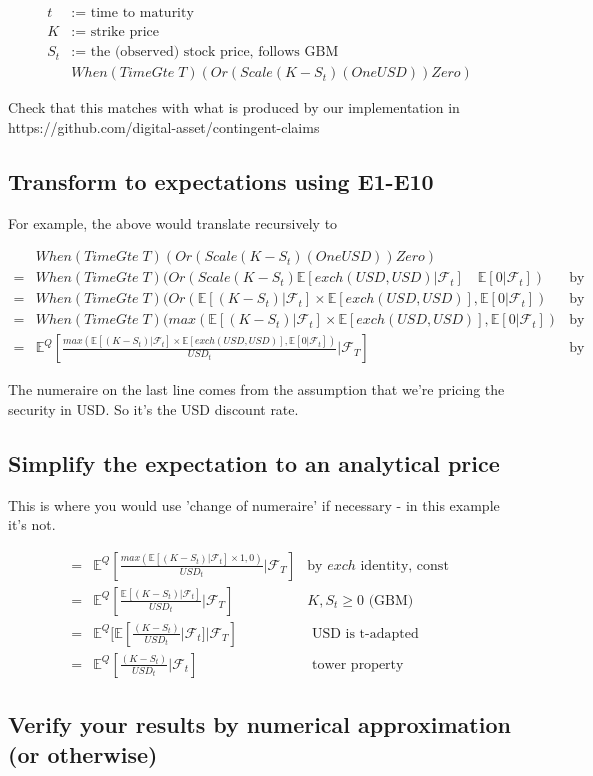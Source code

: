 \documentclass[a4paper]{article}
\begin{document}
\begin{align*}
  t &:= \text{ time to maturity} \\
  K &:= \text{ strike price} \\
  S_t &:= \text{ the (observed) stock price, follows GBM} \\
  & When (TimeGte \; T) (Or (Scale (K - S_t) (One USD)) Zero)
\end{align*}

Check that this matches with what is produced by our implementation in https://github.com/digital-asset/contingent-claims

\subsection{Transform to expectations using E1-E10}

For example, the above would translate recursively to

\begin{align*}
& When (TimeGte \; T) (Or (Scale (K - S_t) (One USD)) Zero) & \\
=& When (TimeGte \; T) (Or (Scale (K - S_t) \mathbb{E}[exch(USD, USD) | \mathcal{F}_t] \quad \mathbb{E}[0 | \mathcal{F}_t])& \text{by E1, E2} \\
=& When (TimeGte \; T) (Or (\mathbb{E}[(K - S_t) | \mathcal{F}_t] \times \mathbb{E}[exch(USD, USD)], \mathbb{E}[0 | \mathcal{F}_t] ) & \text{by E4} \\
=& When (TimeGte \; T) (max(\mathbb{E}[(K - S_t)| \mathcal{F}_t] \times \mathbb{E}[exch(USD, USD)],  \mathbb{E}[0 | \mathcal{F}_t]) & \text{by E6} \\
=& \mathbb{E}^Q [\frac{max(\mathbb{E}[(K - S_t)| \mathcal{F}_t] \times \mathbb{E}[exch(USD, USD)],  \mathbb{E}[0 | \mathcal{F}_t])}{USD_t} | \mathcal{F}_T] & \text{by E8}
\end{align*}

The numeraire on the last line comes from the assumption that we're pricing the security in USD. So it's the USD discount rate.

\subsection{Simplify the expectation to an analytical price}

This is where you would use 'change of numeraire' if necessary - in this example it's not.

\begin{align*}
=& \mathbb{E}^Q [\frac{max(\mathbb{E}[(K - S_t)| \mathcal{F}_t] \times 1, 0)}{USD_t} | \mathcal{F}_T] & \text{by } exch \text{ identity, const} \\
=& \mathbb{E}^Q [\frac{\mathbb{E}[(K - S_t)| \mathcal{F}_t] }{USD_t} | \mathcal{F}_T] & K, S_t \geq 0 \text{ (GBM)} \\
=& \mathbb{E}^Q [\mathbb{E}[\frac{(K - S_t)}{USD_t}| \mathcal{F}_t ]  | \mathcal{F}_T] & \text{ USD is t-adapted } \\
=& \mathbb{E}^Q [\frac{(K - S_t)}{USD_t}|  \mathcal{F}_t] & \text{ tower property }
\end{align*}

\subsection{Verify your results by numerical approximation (or otherwise)}
\end{document}
